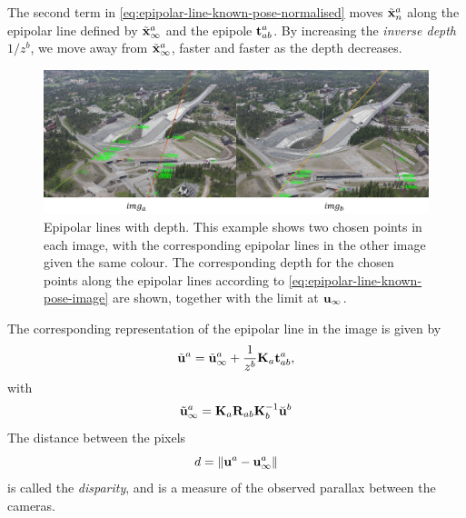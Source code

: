 The second term in \eqref{eq:epipolar-line-known-pose-normalised} moves $\tilde{{\boldsymbol{\mathbf{x}}}}^a_n$ along the epipolar line defined by $\tilde{{\boldsymbol{\mathbf{x}}}}^a_{\infty}$ and the epipole ${\boldsymbol{\mathbf{t}}}^a_{ab}$.
By increasing the \emph{inverse depth} $1/z^b$, we move away from $\tilde{{\boldsymbol{\mathbf{x}}}}^a_{\infty}$, faster and faster as the depth decreases.

\begin{figure}[htb]
    \centering
    \includegraphics[width=\columnwidth]{figures/epipolar-range-example.png}
    \caption{Epipolar lines with depth.
    This example shows two chosen points in each image, with the corresponding epipolar lines in the other image given the same colour.
    The corresponding depth for the chosen points along the epipolar lines according to \eqref{eq:epipolar-line-known-pose-image} are shown, together with the limit at ${\boldsymbol{\mathbf{u}}}_\infty$. 
    }
    \label{fig:epipolar-range-example}
\end{figure}
The corresponding representation of the epipolar line in the image is given by
\begin{equation} \label{eq:epipolar-line-known-pose-image}
\tilde{{\boldsymbol{\mathbf{u}}}}^{a} = \tilde{{\boldsymbol{\mathbf{u}}}}^a_{\infty} + \frac{1}{z^b}{\boldsymbol{\mathbf{K}}}_{a} {\boldsymbol{\mathbf{t}}}^a_{ab},
\end{equation}
with
\begin{equation}
  \tilde{{\boldsymbol{\mathbf{u}}}}^a_{\infty} = {\boldsymbol{\mathbf{K}}}_a {\boldsymbol{\mathbf{R}}}_{ab} {\boldsymbol{\mathbf{K}}}^{-1}_b \breve{{\boldsymbol{\mathbf{u}}}}^b
\end{equation}
The distance between the pixels 
\begin{equation}
  d = \left\lVert{\boldsymbol{\mathbf{u}}}^a - {\boldsymbol{\mathbf{u}}}^a_\infty\right\rVert
\end{equation}
is called the \emph{disparity}, and is a measure of the observed parallax between the cameras.

